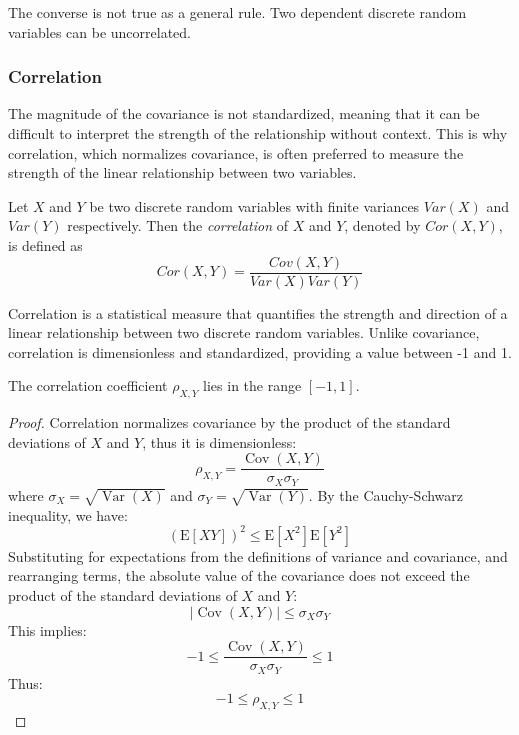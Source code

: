 The converse is not true as a general rule. Two dependent discrete random variables can be uncorrelated.


\subsubsection*{Correlation}

The magnitude of the covariance is not standardized, meaning that it can be difficult to interpret the strength of the relationship without context. This is why correlation, which normalizes covariance, is often preferred to measure the strength of the linear relationship between two variables.

\begin{definition}
Let $X$ and $Y$ be two discrete random variables with finite variances $Var(X)$ and $Var(Y)$ respectively. Then the \emph{correlation} of $X$ and $Y$, denoted by $Cor\left(X,Y\right)$, is defined as
\[
Cor\left(X,Y\right)=\frac{Cov\left(X,Y\right)}{Var(X) Var(Y)}
\]
\end{definition}

Correlation is a statistical measure that quantifies the strength and direction of a linear relationship between two discrete random variables. Unlike covariance, correlation is dimensionless and standardized, providing a value between -1 and 1.

\begin{proposition}
The correlation coefficient \(\rho_{X,Y}\) lies in the range \([-1, 1]\).
\end{proposition}
\begin{proof}
Correlation normalizes covariance by the product of the standard deviations of \(X\) and \(Y\), thus it is dimensionless:
\[
\rho_{X,Y} = \frac{\operatorname{Cov}(X, Y)}{\sigma_X \sigma_Y}
\]
where \(\sigma_X = \sqrt{\operatorname{Var}(X)}\) and \(\sigma_Y = \sqrt{\operatorname{Var}(Y)}\). By the Cauchy-Schwarz inequality, we have:
\[
(\mathrm{E}[XY])^2 \leq \mathrm{E}[X^2] \mathrm{E}[Y^2]
\]
Substituting for expectations from the definitions of variance and covariance, and rearranging terms, the absolute value of the covariance does not exceed the product of the standard deviations of \(X\) and \(Y\):
\[
|\operatorname{Cov}(X, Y)| \leq \sigma_X \sigma_Y
\]
This implies:
\[
-1 \leq \frac{\operatorname{Cov}(X, Y)}{\sigma_X \sigma_Y} \leq 1
\]
Thus:
\[
-1 \leq \rho_{X,Y} \leq 1
\]
\end{proof}

